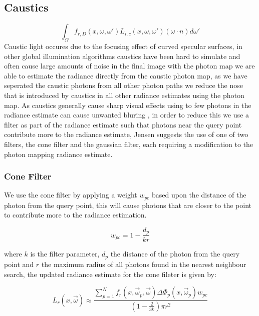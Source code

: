 \subsection{Caustics}
\begin{equation}
		\int_{\Omega}
			f_{r,D}(x, \omega, \omega')
			L_{i,c}(x,\omega,\omega')
			(\omega \cdot n)d\omega'
\end{equation}
Caustic light occures due to the focusing effect of curved specular surfaces, in other global illumination algorithms
caustics have been hard to simulate  and often cause large amounts of noise in the final image 
with the photon map we are able to estimate the radiance directly from the caustic photon map, as we have seperated the
caustic photons from all other photon paths we reduce the nose that is introduced by caustics in all other radiance
estimates using the photon map. As caustics generally cause sharp visual effects using to few photons in the radiance
estimate can cause unwanted bluring , in order to reduce this we use a filter as part of the radiance estimate such
that photons near the query point contribute more to the radiance estimate, Jensen suggests the use of one of two filters, the
cone filter and the gaussian filter, each requiring a modification to the photon mapping radiance estimate.

\subsubsection{Cone Filter}
We use the cone filter by applying a weight $w_{pc}$ based upon the distance of the photon from the query point, this will
cause photons that are closer to the point to contribute more to the radiance estimation.

\begin{equation}
w_{pc} = 1 - \frac{d_p}{k r}
\end{equation}

where $k$ is the filter parameter, $d_p$ the distance of the photon from the query point and $r$ the maximum radius of
all photons found in the nearest neighbour search, the updated radiance estimate for the cone fileter is given by:

\begin{equation}
L_r(x, \vec{\omega}) \approx
\frac
{\sum\limits_{p=1}^N f_r(x, \vec{\omega}_p,\vec{\omega})\Delta \Phi_p(x,\vec{\omega}_p)w_{pc}}
{(1 - \frac{2}{3k})\pi r ^2}
\end{equation}

